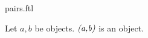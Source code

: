 \documentclass{naproche-library}
\begin{document}
\begin{smodule}[title=Pairs]{pairs.ftl}


\begin{fakeforthel}
  \begin{signature}
    Let $a,b$ be objects.
    $\emph{(a,b)}$ is an object.
  \end{signature}
\end{fakeforthel}

\end{smodule}
\end{document}
